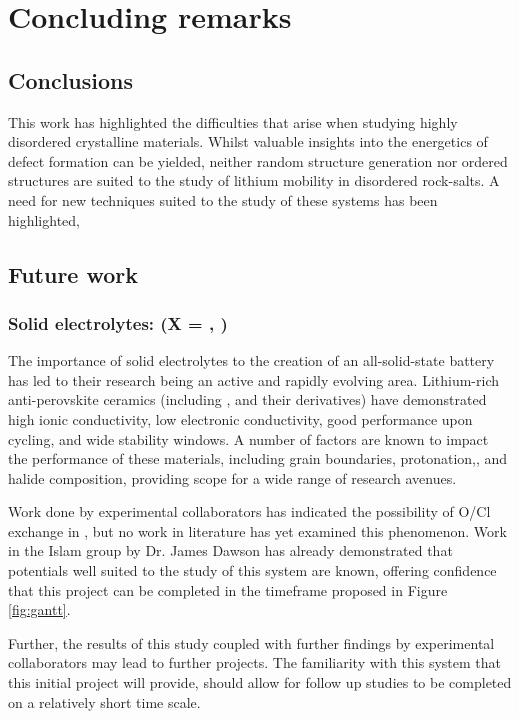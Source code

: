\chapter{Concluding remarks}

\section{Conclusions}
This work has highlighted the difficulties that arise when studying highly disordered crystalline materials.
Whilst valuable insights into the energetics of defect formation can be yielded, neither random structure generation nor ordered structures are suited to the study of lithium mobility in disordered rock-salts.
A need for new techniques suited to the study of these systems has been highlighted, 
\newpage
\section{Future work}

\subsection{Solid electrolytes:  (X = , )}
The importance of solid electrolytes to the creation of an all-solid-state battery has led to their research being an active and rapidly evolving area.
Lithium-rich anti-perovskite ceramics (including ,  and their derivatives)\cite{Zhao2012} have demonstrated high ionic conductivity, low electronic conductivity, good performance upon cycling, and wide stability windows.
A number of factors are known to impact the performance of these materials, including grain boundaries,\cite{Dawson2018} protonation,\cite{Dawson2018a}, and halide composition,\cite{Dawson2018b} providing scope for a wide range of research avenues.

Work done by experimental collaborators has indicated the possibility of O/Cl exchange in , but no work in literature has yet examined this phenomenon.
Work in the Islam group by Dr. James Dawson has already demonstrated that potentials well suited to the study of this system are known, offering confidence that this project can be completed in the timeframe proposed in Figure \ref{fig:gantt}.

Further, the results of this study coupled with further findings by experimental collaborators may lead to further projects.
The familiarity with this system that this initial project will provide, should allow for follow up studies to be completed on a relatively short time scale.

